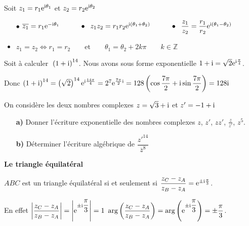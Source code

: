  \begin{property}
 Soit $ z_1= r_1\mathrm{e}^{\text{i}\theta_1} $ \; et \; $ z_2= r_2\mathrm{e}^{\text{i}\theta_2} $
 
 \begin{itemize}
 \item[$  \bullet$]  $ \overline{z_1}= r_1\mathrm{e}^{-\text{i}\theta_1}   \hspace*{1cm}  \bullet\; \;z_1 z_2 =r_1r_2\mathrm{e}^{\text{i}(\theta_1+\theta_2)}  \hspace*{1cm}  \bullet\; \; \dfrac{z_1}{z_2} =\dfrac{r_1}{r_2}\mathrm{e}^{\text{i}(\theta_1-\theta_2)}$ 
 
 \medskip
 \item $ z_1= z_2 \Longleftrightarrow r_1= r_2 \qquad\text{et}\qquad \theta_1= \theta_2 +2k\pi\qquad   k\in\mathbb{Z}$
 \end{itemize}
  \end{property}
 \begin{example}
 Soit à calculer  $\; \left(1+\text{i}\right)^{14} $. Nous avons sous forme exponentielle   
 $ 1+\text{i} =\sqrt{2}\mathrm{e}^{\text{i}\frac{\pi}{4}}$.
 
 
 \medskip
 
Donc  $ \left(1+\text{i}\right)^{14}=\left( \sqrt{2}\right)^{14}\mathrm{e}^{\text{i}\frac{14\pi}{4}}=2^7\mathrm{e}^{\frac{7\pi}{2}\text{i}}=128\left(\cos \dfrac{7\pi}{2} +\text{i} \sin \dfrac{7\pi}{2}\right)=128\text{i}$
 \end{example}
 \begin{exercice}
 On considère les deux nombres complexes \; $ z=\sqrt{3} +\text{i} $\; et\; $ z'=-1+\text{i} $
 
 \begin{itemize}
 \item[\textbf{a)}] Donner l'écriture exponentielle des nombres complexes $ z $, $ z' $, $ zz' $, $ \frac{z}{z'} $, $ z^5 $.
 \item[\textbf{b)}] Déterminer l'écriture algébrique  de\;  $ \dfrac{z'^{14}}{\overline{z}^8} $
 \end{itemize}
  \end{exercice}
 \bigskip
 
 \textbf{Le triangle équilatéral}

 $ ABC $ est un triangle équilatéral si et seulement si \; $ \dfrac{z_C-z_A}{z_B-z_A} =\mathrm{e}^{\pm\text{i}\frac{\pi}{3}}$.
 
 
 \medskip
 
 En effet $ \left\lvert \dfrac{z_C-z_A}{z_B-z_A}  \right\rvert=\left\lvert \mathrm{e}^{\pm\text{i}\dfrac{\pi}{3}} \right\rvert=1 $
 \qquad  $\text{arg}\left(\dfrac{z_C-z_A}{z_B-z_A}\right) =\text{arg}\left(\mathrm{e}^{\pm\text{i}\dfrac{\pi}{3}}\right)=\pm \dfrac{\pi}{3}$.
 
